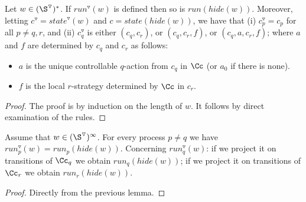 \documentclass[10pt,a4paper]{article}
\newcommand{\run}{\mathit{run}}
\newcommand{\hide}{\mathit{hide}}
\newcommand{\red}[1]{#1^\triangledown}
\newcommand{\state}{\mathit{state}}
\begin{document}
\begin{lemma}\label{lemma:C invariant}
  Let $w\in (\red\S)^*$. If $\red\run(w)$ is defined then so is
  $\run(\hide(w))$.  Moreover, letting $\red c=\red\state(w)$ and
  $c=\state(\hide(w))$, we have that
(i) $\red c_p=c_p$  for all $p\not=q,r$, and (ii) 
  $\red c_q$ is either $(c_q,c_r)$, or $(c_q,c_r,f)$, or
  $(c_q,a,c_r,f)$; where $a$ and $f$ are 
  determined by $c_q$ and $c_r$ as follows:
  \begin{itemize}
  \item $a$ is the unique controllable $q$-action from $c_q$ in $\Cc$ (or
    $a_0$ if there is none).
  \item $f$ is the local $r$-strategy determined by $\Cc$
    in $c_r$.
  \end{itemize}
\end{lemma}
\begin{proof}
  The proof is by induction on the length of $w$. It follows by direct
  examination of the rules.
\end{proof}

\begin{lemma}\label{lemma:projecting-runs}
  Assume that $w\in( \red \S)^\infty$. For every process $p\not=q$ we have
  $\red\run_p(w)=\run_p(\hide(w))$. Concerning
  $\red\run_q(w)$: if we project it on transitions of $\Cc_q$ we obtain
  $\run_q(\hide(w))$; if we project it  on transitions of
  $\Cc_r$ we obtain $\run_r(\hide(w))$.
\end{lemma}
\begin{proof}
  Directly from the previous lemma.
\end{proof}
\end{document}
